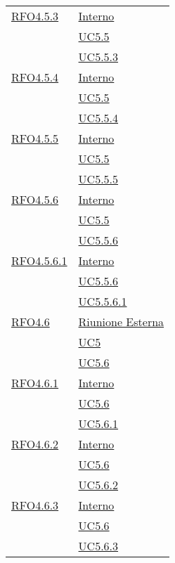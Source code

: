 \begin{longtable}{|>{\centering}m{5cm}|m{5cm}<{\centering}|}
\hyperlink{RFO4.5.3}{RFO4.5.3} & \hyperlink{Interno}{Interno}\\
& \hyperref[UC5.5]{UC5.5}\\
& \hyperref[UC5.5.3]{UC5.5.3}\\ \hline

\hyperlink{RFO4.5.4}{RFO4.5.4} & \hyperlink{Interno}{Interno}\\
& \hyperref[UC5.5]{UC5.5}\\
& \hyperref[UC5.5.4]{UC5.5.4}\\ \hline

\hyperlink{RFO4.5.5}{RFO4.5.5} & \hyperlink{Interno}{Interno}\\
& \hyperref[UC5.5]{UC5.5}\\
& \hyperref[UC5.5.5]{UC5.5.5}\\ \hline

\hyperlink{RFO4.5.6}{RFO4.5.6} & \hyperlink{Interno}{Interno}\\
& \hyperref[UC5.5]{UC5.5}\\
& \hyperref[UC5.5.6]{UC5.5.6}\\ \hline

\hyperlink{RFO4.5.6.1}{RFO4.5.6.1} & \hyperlink{Interno}{Interno}\\
& \hyperref[UC5.5.6]{UC5.5.6}\\
& \hyperref[UC5.5.6.1]{UC5.5.6.1}\\ \hline

\hyperlink{RFO4.6}{RFO4.6} & \hyperlink{Riunione Esterna}{Riunione Esterna}\\
& \hyperref[UC5]{UC5}\\
& \hyperref[UC5.6]{UC5.6}\\ \hline

\hyperlink{RFO4.6.1}{RFO4.6.1} & \hyperlink{Interno}{Interno}\\
& \hyperref[UC5.6]{UC5.6}\\
& \hyperref[UC5.6.1]{UC5.6.1}\\ \hline

\hyperlink{RFO4.6.2}{RFO4.6.2} & \hyperlink{Interno}{Interno}\\
& \hyperref[UC5.6]{UC5.6}\\
& \hyperref[UC5.6.2]{UC5.6.2}\\ \hline

\hyperlink{RFO4.6.3}{RFO4.6.3} & \hyperlink{Interno}{Interno}\\
& \hyperref[UC5.6]{UC5.6}\\
& \hyperref[UC5.6.3]{UC5.6.3}\\ \hline


\end{longtable}

